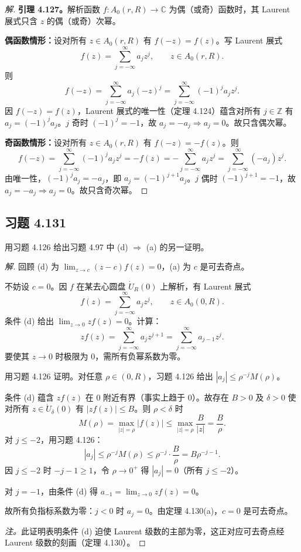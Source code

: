 \documentclass[11pt,a4paper]{article}
\newcommand{\C}{\mathbb{C}}
\newcommand{\Z}{\mathbb{Z}}
\theoremstyle{definition}
\newenvironment{solution}{\begin{proof}[解]}{\end{proof}}
\begin{document}
\begin{solution}
  \textbf{引理 4.127。}解析函数 $f : A_0(r, R) \to \C$ 为偶（或奇）函数时，其 Laurent 展式只含 $z$ 的偶（或奇）次幂。

  \medskip
  \noindent\textbf{偶函数情形：}设对所有 $z \in A_0(r, R)$ 有 $f(-z) = f(z)$。写 Laurent 展式
  \[
    f(z) = \sum_{j=-\infty}^{\infty} a_j z^j, \qquad z \in A_0(r, R).
  \]
  则
  \[
    f(-z) = \sum_{j=-\infty}^{\infty} a_j (-z)^j
    = \sum_{j=-\infty}^{\infty} (-1)^j a_j z^j.
  \]
  因 $f(-z) = f(z)$，Laurent 展式的唯一性（定理 4.124）蕴含对所有 $j \in \Z$ 有 $a_j = (-1)^j a_j$。$j$ 奇时 $(-1)^j = -1$，故 $a_j = -a_j \Rightarrow a_j = 0$。故只含偶次幂。

  \medskip
  \noindent\textbf{奇函数情形：}设对所有 $z \in A_0(r, R)$ 有 $f(-z) = -f(z)$。则
  \[
    f(-z) = \sum_{j=-\infty}^{\infty} (-1)^j a_j z^j
    = -f(z) = -\sum_{j=-\infty}^{\infty} a_j z^j
    = \sum_{j=-\infty}^{\infty} (-a_j) z^j.
  \]
  由唯一性，$(-1)^j a_j = -a_j$，即 $a_j = (-1)^{j+1} a_j$。$j$ 偶时 $(-1)^{j+1} = -1$，故 $a_j = -a_j \Rightarrow a_j = 0$。故只含奇次幂。
\end{solution}

\subsection{习题 4.131}

用习题 4.126 给出习题 4.97 中 (d) $\Rightarrow$ (a) 的另一证明。

\begin{solution}
  回顾 (d) 为 $\lim_{z \to c} (z-c)f(z) = 0$，(a) 为 $c$ 是可去奇点。

  不妨设 $c = 0$。因 $f$ 在某去心圆盘 $\dot{U}_R(0)$ 上解析，有 Laurent 展式
  \[
    f(z) = \sum_{j=-\infty}^{\infty} a_j z^j, \qquad z \in A_0(0, R).
  \]
  条件 (d) 给出 $\lim_{z \to 0} z f(z) = 0$。计算：
  \[
    z f(z) = \sum_{j=-\infty}^{\infty} a_j z^{j+1}
    = \sum_{j=-\infty}^{\infty} a_{j-1} z^j.
  \]
  要使其 $z \to 0$ 时极限为 $0$，需所有负幂系数为零。

  用习题 4.126 证明。对任意 $\rho \in (0, R)$，习题 4.126 给出 $|a_j| \le \rho^{-j} M(\rho)$。

  条件 (d) 蕴含 $z f(z)$ 在 $0$ 附近有界（事实上趋于 $0$）。故存在 $B > 0$ 及 $\delta > 0$ 使对所有 $z \in \dot{U}_{\delta}(0)$ 有 $|z f(z)| \le B$。则 $\rho < \delta$ 时
  \[
    M(\rho) = \max_{|z|=\rho} |f(z)|
    \le \max_{|z|=\rho} \frac{B}{|z|} = \frac{B}{\rho}.
  \]
  对 $j \le -2$，用习题 4.126：
  \[
    |a_j| \le \rho^{-j} M(\rho) \le \rho^{-j} \cdot \frac{B}{\rho}
    = B \rho^{-j-1}.
  \]
  因 $j \le -2$ 时 $-j-1 \ge 1$，令 $\rho \to 0^+$ 得 $|a_j| = 0$（所有 $j \le -2$）。

  对 $j = -1$，由条件 (d) 得 $a_{-1} = \lim_{z \to 0} z f(z) = 0$。

  故所有负指标系数为零：$j < 0$ 时 $a_j = 0$。由定理 4.130(a)，$c = 0$ 是可去奇点。

  \medskip
  \noindent\textit{注。}此证明表明条件 (d) 迫使 Laurent 级数的主部为零，这正对应可去奇点经 Laurent 级数的刻画（定理 4.130）。
\end{solution}
\end{document}
